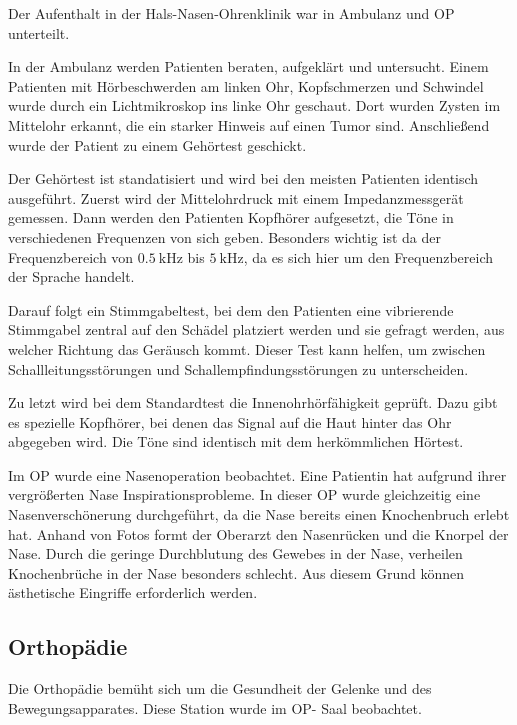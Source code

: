 \documentclass[11pt,a4paper,titlepage]{scrartcl}
\begin{document}
Der Aufenthalt in der Hals-Nasen-Ohrenklinik war in Ambulanz und OP unterteilt. \medskip

In der Ambulanz werden Patienten beraten, aufgeklärt und untersucht. Einem Patienten mit Hörbeschwerden am linken Ohr, Kopfschmerzen und Schwindel wurde durch ein Lichtmikroskop ins linke Ohr geschaut. Dort wurden Zysten im Mittelohr erkannt, die ein starker Hinweis auf einen Tumor sind. Anschließend wurde der Patient zu einem Gehörtest geschickt. \medskip

Der Gehörtest ist standatisiert und wird bei den meisten Patienten identisch ausgeführt. Zuerst wird der Mittelohrdruck mit einem Impedanzmessgerät gemessen. Dann werden den Patienten Kopfhörer aufgesetzt, die Töne in verschiedenen Frequenzen von sich geben. Besonders wichtig ist da der Frequenzbereich von $\SI{0,5}{\kilo\hertz}$ bis $\SI{5}{\kilo\hertz}$, da es sich hier um den Frequenzbereich der Sprache handelt. \medskip

Darauf folgt ein Stimmgabeltest, bei dem den Patienten eine vibrierende Stimmgabel zentral auf den Schädel platziert werden und sie gefragt werden, aus welcher Richtung das Geräusch kommt. Dieser Test kann helfen, um zwischen Schallleitungsstörungen und Schallempfindungsstörungen zu unterscheiden. \medskip

Zu letzt wird bei dem Standardtest die Innenohrhörfähigkeit geprüft. Dazu gibt es spezielle Kopfhörer, bei denen das Signal auf die Haut hinter das Ohr abgegeben wird. Die Töne sind identisch mit dem herkömmlichen Hörtest. \medskip

Im OP wurde eine Nasenoperation beobachtet. Eine Patientin hat aufgrund ihrer vergrößerten Nase Inspirationsprobleme. In dieser OP wurde gleichzeitig eine Nasenverschönerung durchgeführt, da die Nase bereits einen Knochenbruch erlebt hat. Anhand von Fotos formt der Oberarzt den Nasenrücken und die Knorpel der Nase. Durch die geringe Durchblutung des Gewebes in der Nase, verheilen Knochenbrüche in der Nase besonders schlecht. Aus diesem Grund können ästhetische Eingriffe erforderlich werden. \medskip



\subsection{Orthopädie}

Die Orthopädie bemüht sich um die Gesundheit der Gelenke und des Bewegungsapparates. Diese Station wurde im OP- Saal beobachtet. \medskip
\end{document}
